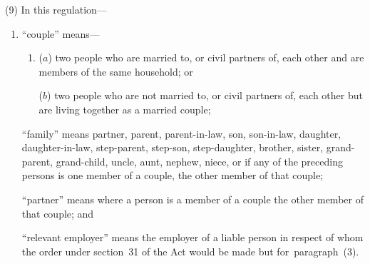 \documentclass[12pt,a4paper]{article}
\begin{document}
(9) In this regulation—
\begin{enumerate}\item[]
%
%
%

“couple” means—
\begin{enumerate}\item[]
($a$) 
two people who are married to, or civil partners of, each other and are members of the same household; or

($b$) 
two people who are not married to, or civil partners of, each other but are living together as a married couple;
\end{enumerate}

“family” means partner, parent, parent-in-law, son, son-in-law, daughter, daughter-in-law, step-parent, step-son, step-daughter, brother, sister, grand-parent, grand-child, uncle, aunt, nephew, niece, or if any of the preceding persons is one member of a couple, the other member of that couple;

“partner” means where a person is a member of a couple the other member of that couple; and

“relevant employer” means the employer of a liable person in respect of whom the order under section~31 of the Act would be made but for~paragraph~(3).
\end{enumerate}
\end{document}
